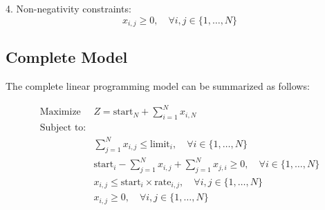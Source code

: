 \documentclass{article}
\begin{document}
4. Non-negativity constraints:
\[
x_{i,j} \geq 0, \quad \forall i,j \in \{1, \ldots, N\}
\]

\subsection*{Complete Model}
The complete linear programming model can be summarized as follows:

\begin{align*}
\text{Maximize } & Z = \text{start}_N + \sum_{i=1}^{N} x_{i,N} \\
\text{Subject to:} & \\
& \sum_{j=1}^{N} x_{i,j} \leq \text{limit}_i, \quad \forall i \in \{1, \ldots, N\} \\
& \text{start}_i - \sum_{j=1}^{N} x_{i,j} + \sum_{j=1}^{N} x_{j,i} \geq 0, \quad \forall i \in \{1, \ldots, N\} \\
& x_{i,j} \leq \text{start}_i \times \text{rate}_{i,j}, \quad \forall i,j \in \{1, \ldots, N\} \\
& x_{i,j} \geq 0, \quad \forall i,j \in \{1, \ldots, N\}
\end{align*}
\end{document}
